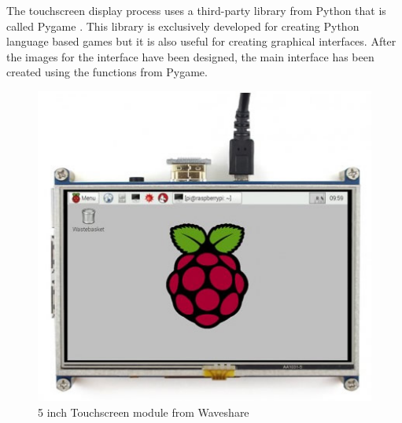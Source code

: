 The touchscreen display process uses a third-party library from Python that is called Pygame \cite{pygame}. This library is exclusively developed for creating Python language based games but it is also useful for creating graphical interfaces. After the images for the interface have been designed, the main interface has been created using the functions from Pygame. 
\begin{figure}[!ht]
	\includegraphics[scale=0.6]{content/images/touschreen5inc.jpg}
	\caption{5 inch Touchscreen module from Waveshare}
	\label{fig:touschreen5inc}
\end{figure}

